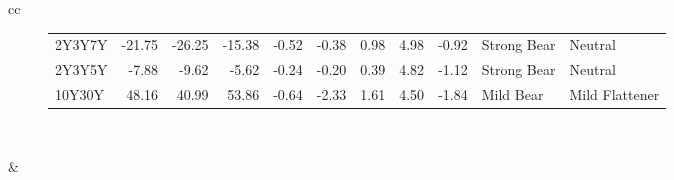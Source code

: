 \documentclass[a4paper,oneside]{report}
\begin{document}
\begin{figure}[htbp]
\begin{tabular}[c]{cc}
\begin{subfigure}[c]{0.5\textwidth}
\begin{adjustbox}{max width=\textwidth}
\begin{tabular}{lrrrrrrrrll}
   2Y3Y7Y &  -21.75 &   -26.25 &    -15.38 &  -0.52 & -0.38 &      0.98 &   4.98 &    -0.92 &  Strong Bear &           Neutral \\
   2Y3Y5Y &   -7.88 &    -9.62 &     -5.62 &  -0.24 & -0.20 &      0.39 &   4.82 &    -1.12 &  Strong Bear &           Neutral \\
   10Y30Y &   48.16 &    40.99 &     53.86 &  -0.64 & -2.33 &      1.61 &   4.50 &    -1.84 &    Mild Bear &    Mild Flattener \\
\hline
\end{tabular}
\end{adjustbox}
\end{subfigure}\\
 
 

\begin{subfigure}[c]{0.5\textwidth}
 
 \null\hfill
 \end{subfigure}&
 

\end{tabular}
\end{figure}
\end{document}
